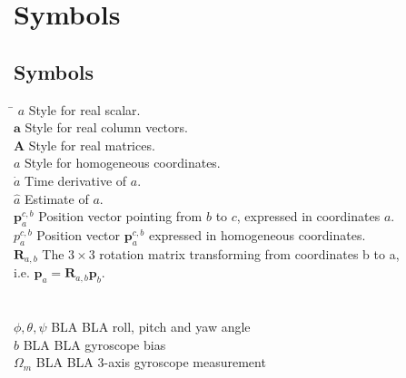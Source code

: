 \chapter*{Symbols}
\label{sec:symbols}

\section*{Symbols}

\begin{tabbing}
 \hspace*{3cm} \= \kill
  $a$                     \> Style for real scalar. \\[0.5ex]
  $\mathbf{a}$            \> Style for real column vectors. \\[0.5ex]
  $\mathbf{A}$            \> Style for real matrices. \\[0.5ex]
  $\mathbf{\textit{a}}$   \> Style for homogeneous coordinates. \\[0.5ex]
  $\dot{a}$               \> Time derivative of $a$. \\[0.5ex]
  $\hat{a}$               \> Estimate of $a$. \\[0.5ex]
  $\mathbf{p}^{c,b}_a$    \> Position vector pointing from $b$ to $c$, expressed in coordinates $a$. \\[0.5ex]
  $\mathbf{\textit{p}}^{c,b}_a$    \> Position vector $\mathbf{p}^{c,b}_a$ expressed in homogeneous coordinates. \\[0.5ex]
  $\mathbf{R}_{a,b}$      \> The $3\times3$ rotation matrix transforming from coordinates b to a, \\ \> i.e. $\mathbf{p}_a=\mathbf{R}_{a,b}\mathbf{p}_b$. \\[0.5ex]
  
  \\
  \\
  $\phi, \theta, \psi$    \> BLA BLA roll, pitch and yaw angle \\[0.5ex]
  $b$                     \> BLA BLA gyroscope bias \\[0.5ex]										
  $\Omega_m$              \> BLA BLA 3-axis gyroscope measurement \\[0.5ex]   		
\end{tabbing}

